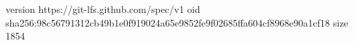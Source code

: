 version https://git-lfs.github.com/spec/v1
oid sha256:98c56791312cb49b1e0f919024a65e9852fe9f02685ffa604cf8968e90a1cf18
size 1854

